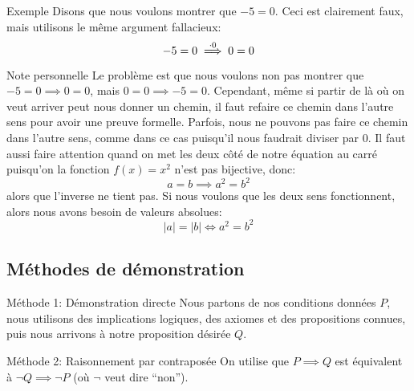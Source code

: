 \documentclass[a4paper]{article}
\begin{document}
\begin{parag}{Exemple}
    Disons que nous voulons montrer que $-5 = 0$. Ceci est clairement faux, mais utilisons le même argument fallacieux: 
    \[-5 = 0 \over{\implies}{$\cdot 0$} 0 = 0\]
    
    \begin{subparag}{Note personnelle}
        Le problème est que nous voulons non pas montrer que $-5 = 0 \implies 0 = 0$, mais $0 = 0 \implies -5 = 0$. Cependant, même si partir de là où on veut arriver peut nous donner un chemin, il faut refaire ce chemin dans l'autre sens pour avoir une preuve formelle. Parfois, nous ne pouvons pas faire ce chemin dans l'autre sens, comme dans ce cas puisqu'il nous faudrait diviser par 0. Il faut aussi faire attention quand on met les deux côté de notre équation au carré puisqu'on la fonction $f\left(x\right) = x^2$ n'est pas bijective, donc: 
        \[a = b \implies a^2 = b^2\]
        alors que l'inverse ne tient pas. Si nous voulons que les deux sens fonctionnent, alors nous avons besoin de valeurs absolues: 
        \[\left|a\right| = \left|b\right| \iff a^2 = b^2\]
    \end{subparag}
\end{parag}
\subsection{Méthodes de démonstration}
\begin{parag}{Méthode 1: Démonstration directe}
    Nous partons de nos conditions données $P$, nous utilisons des implications logiques, des axiomes et des propositions connues, puis nous arrivons à notre proposition désirée $Q$.
\end{parag}

\begin{parag}{Méthode 2: Raisonnement par contraposée}
    On utilise que $P \implies Q$ est équivalent à $\lnot Q \implies \lnot P$ (où $\lnot$ veut dire ``non'').
\end{parag}
\end{document}
